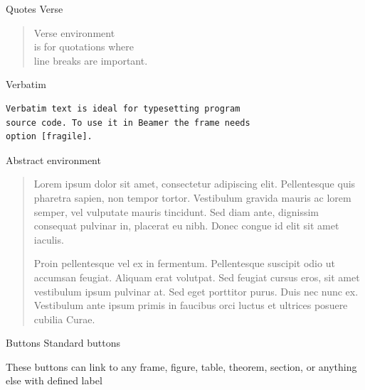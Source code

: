 \documentclass[11pt,t,aspectratio=1610,nonav]{beamer}
\begin{document}
\begin{frame}[fragile]{Quotes}
Verse
\begin{verse}
	Verse environment \\ 
	is for quotations where \\
	line breaks are important. 
\end{verse}

\vspace{11pt}
Verbatim
\begin{verbatim}
Verbatim text is ideal for typesetting program
source code. To use it in Beamer the frame needs
option [fragile].
\end{verbatim}
\end{frame}




\begin{frame}
\vspace{15pt}
Abstract environment
\begin{abstract}
	Lorem ipsum dolor sit amet, consectetur adipiscing elit. Pellentesque quis pharetra sapien, non tempor tortor. Vestibulum gravida mauris ac lorem semper, vel vulputate mauris tincidunt. Sed diam ante, dignissim consequat pulvinar in, placerat eu nibh. Donec congue id elit sit amet iaculis.
	
	Proin pellentesque vel ex in fermentum. Pellentesque suscipit odio ut accumsan feugiat. Aliquam erat volutpat. Sed feugiat cursus eros, sit amet vestibulum ipsum pulvinar at. Sed eget porttitor purus. Duis nec nunc ex. Vestibulum ante ipsum primis in faucibus orci luctus et ultrices posuere cubilia Curae.
\end{abstract}
\end{frame}




\begin{frame}[label=buttons]{Buttons}
Standard buttons

	\hyperlink{fig:figure1}{}

	\hyperlink{extraframe}{}


	\beamerreturnbutton{}

\vspace{11pt}
These buttons can link to any frame, figure, table, theorem, section, or anything else with defined label
\end{frame}
\end{document}
